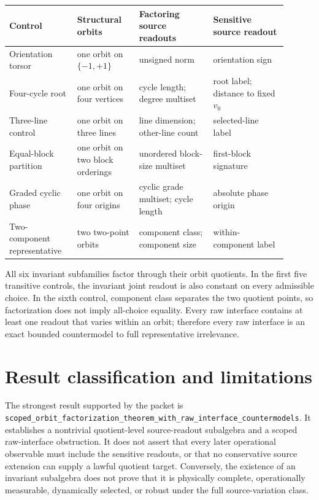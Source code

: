 \documentclass[11pt]{article}
\theoremstyle{definition}
\begin{document}
\begin{longtable}{>{\raggedright\arraybackslash}p{0.22\linewidth}
                  >{\raggedright\arraybackslash}p{0.20\linewidth}
                  >{\raggedright\arraybackslash}p{0.24\linewidth}
                  >{\raggedright\arraybackslash}p{0.24\linewidth}}
\toprule
Control & Structural orbits & Factoring source readouts & Sensitive source readout\\
\midrule
\endhead
Orientation torsor & one orbit on $\{-1,+1\}$
& unsigned norm & orientation sign\\
Four-cycle root & one orbit on four vertices
& cycle length; degree multiset & root label; distance to fixed $v_0$\\
Three-line control & one orbit on three lines
& line dimension; other-line count & selected-line label\\
Equal-block partition & one orbit on two block orderings
& unordered block-size multiset & first-block signature\\
Graded cyclic phase & one orbit on four origins
& cyclic grade multiset; cycle length & absolute phase origin\\
Two-component representative & two two-point orbits
& component class; component size & within-component label\\
\bottomrule
\end{longtable}

All six invariant subfamilies factor through their orbit quotients.  In the
first five transitive controls, the invariant joint readout is also constant
on every admissible choice.  In the sixth control, component class separates
the two quotient points, so factorization does not imply all-choice equality.
Every raw interface contains at least one readout that varies within an orbit;
therefore every raw interface is an exact bounded countermodel to full
representative irrelevance.

\section{Result classification and limitations}

The strongest result supported by the packet is
\texttt{scoped\_orbit\_factorization\_theorem\_with\_raw\_interface\_countermodels}.
It establishes a nontrivial quotient-level source-readout subalgebra and a
scoped raw-interface obstruction.  It does not assert that every later
operational observable must include the sensitive readouts, or that no
conservative source extension can supply a lawful quotient target.  Conversely,
the existence of an invariant subalgebra does not prove that it is physically
complete, operationally measurable, dynamically selected, or robust under the
full source-variation class.
\end{document}
